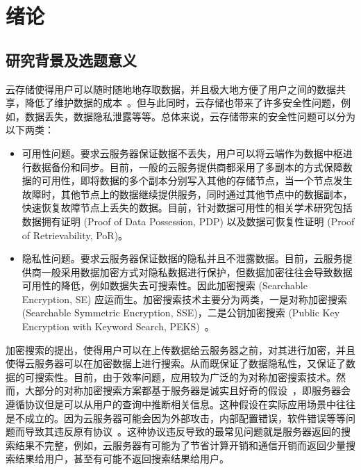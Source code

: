 \chapter{绪论}
\label{cha:intro}
\section{研究背景及选题意义}
云存储使得用户可以随时随地地存取数据，并且极大地方便了用户之间的数据共享，降低了维护数据的成本~\cite{juels2007pors,ateniese2008scalable,kamara2011cs2,wang2011enabling,stefanov2012iris,kamara2013parallel,sun2015catch}。但与此同时，云存储也带来了许多安全性问题，例如，数据丢失，数据隐私泄露等等。总体来说，云存储带来的安全性问题可以分为以下两类：
\begin{itemize}
	\item 可用性问题。要求云服务器保证数据不丢失，用户可以将云端作为数据中枢进行数据备份和同步。目前，一般的云服务提供商都采用了多副本的方式保障数据的可用性，即将数据的多个副本分别写入其他的存储节点，当一个节点发生故障时，其他节点上的数据继续提供服务，同时通过其他节点中的数据副本，快速恢复故障节点上丢失的数据。目前，针对数据可用性的相关学术研究包括数据拥有证明 (Proof of Data Possession, PDP)\cite{ateniese2007provable, ateniese2008scalable, erway2015dynamic,zhu2012cooperative} 以及数据可恢复性证明 (Proof of Retrievability, PoR)\cite{juels2007pors, bowers2009proofs, stefanov2012iris}。
	\item 隐私性问题。要求云服务器保证数据的隐私并且不泄露数据。目前，云服务提供商一般采用数据加密方式对隐私数据进行保护，但数据加密往往会导致数据可用性的降低，例如数据失去可搜索性。因此加密搜索 (Searchable Encryption, SE) 应运而生。加密搜索技术主要分为两类，一是对称加密搜索 (Searchable Symmetric Encryption, SSE)\cite{song2000practical,curtmola2011searchable,kamara2012dynamic,cash2014dynamic,wang2016searchable}，二是公钥加密搜索 (Public Key Encryption with Keyword Search, PEKS)~\cite{boneh2004public}。
\end{itemize}
加密搜索的提出，使得用户可以在上传数据给云服务器之前，对其进行加密，并且使得云服务器可以在加密数据上进行搜索。从而既保证了数据隐私性，又保证了数据的可搜索性。目前，由于效率问题，应用较为广泛的为对称加密搜索技术。然而，大部分的对称加密搜索方案都基于服务器是诚实且好奇的假设~\cite{curtmola2011searchable, kamara2012dynamic, cash2014dynamic}，即服务器会遵循协议但是可以从用户的查询中推断相关信息。这种假设在实际应用场景中往往是不成立的。因为云服务器可能会因为外部攻击，内部配置错误，软件错误等等问题而导致其违反原有协议~\cite{sun2015catch,bost2016verifiable}。这种协议违反导致的最常见问题就是服务器返回的搜索结果不完整，例如，云服务器有可能为了节省计算开销和通信开销而返回少量搜索结果给用户，甚至有可能不返回搜索结果给用户。


